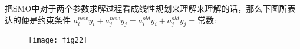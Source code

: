 \documentclass[a4paper,12pt]{article}
\begin{document}
把SMO中对于两个参数求解过程看成线性规划来理解来理解的话，那么下图所表达的便是约束条件
$ a_i^{new}y_i+a_j^{new}y_j= a_i^{old}y_i+a_j^{old}y_j=\text{常数}$:

\begin{figure}[H]
  \centering
  \texttt{[image: fig22]}
\end{figure}



%
%
%
%
%
%
%
%
%
%
%
\end{document}

